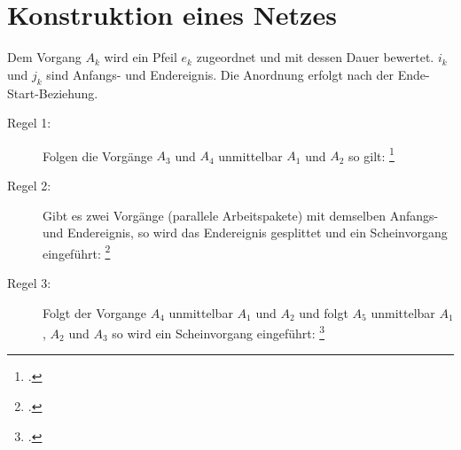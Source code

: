 \documentclass{lehramt-informatik-haupt}
\begin{document}
%

\section{Konstruktion eines Netzes}

Dem Vorgang $A_k$ wird ein Pfeil $e_k$ zugeordnet und mit dessen Dauer
bewertet.
%
$i_k$ und $j_k$ sind Anfangs- und Endereignis.
%
Die Anordnung erfolgt nach der Ende-Start-Beziehung.

\begin{center}
\end{center}

\begin{description}

\item[Regel 1:] Folgen die Vorgänge $A_3$ und $A_4$ unmittelbar $A_1$
und $A_2$ so gilt:
\footcite[Seite 24]{sosy:fs:3}

\begin{center}
\end{center}

\item[Regel 2:] Gibt es zwei Vorgänge (parallele Arbeitspakete) mit
demselben Anfangs- und Endereignis, so wird das Endereignis gesplittet
und ein Scheinvorgang eingeführt:
\footcite[Seite 25]{sosy:fs:3}

\begin{center}
\end{center}

\item[Regel 3:] Folgt der Vorgange $A_4$ unmittelbar $A_1$ und $A_2$ und
folgt $A_5$ unmittelbar $A_1$ , $A_2$ und $A_3$ so wird ein
Scheinvorgang eingeführt:
\footcite[Seite 26]{sosy:fs:3}
\end{description}
\end{document}
